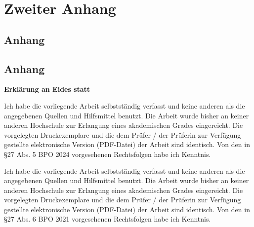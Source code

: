 \documentclass[11pt,a4paper,german,notitlepage]{report}
\begin{document}
\chapter{Zweiter Anhang}
\label{chap:anhang_2}

\section{Anhang}
\label{sec:anhang_2_1}

\section{Anhang}
\label{sec:anhang_2_2}

\clearpage

{}



\clearpage

%
%
%

\thispagestyle{empty}
\label{erklaerung}

\setlength{\parindent}{0em}

\textbf{\large{Erklärung an Eides statt}}

\vspace*{65pt}


Ich habe die vorliegende Arbeit selbstständig verfasst und keine anderen als die angegebenen Quellen und Hilfsmittel benutzt. Die Arbeit wurde bisher an keiner anderen Hochschule zur Erlangung eines akademischen Grades eingereicht. Die vorgelegten Druckexemplare und die dem Prüfer / der Prüferin zur Verfügung gestellte elektronische Version (PDF-Datei) der Arbeit sind identisch. Von den in §27 Abs. 5 BPO 2024 vorgesehenen Rechtsfolgen habe ich Kenntnis. 

Ich habe die vorliegende Arbeit selbstständig verfasst und keine anderen als die angegebenen Quellen und Hilfsmittel benutzt. Die Arbeit wurde bisher an keiner anderen Hochschule zur Erlangung eines akademischen Grades eingereicht. Die vorgelegten Druckexemplare und die dem Prüfer / der Prüferin zur Verfügung gestellte elektronische Version (PDF-Datei) der Arbeit sind identisch. Von den in §27 Abs. 6 BPO 2021 vorgesehenen Rechtsfolgen habe ich Kenntnis.
\end{document}
